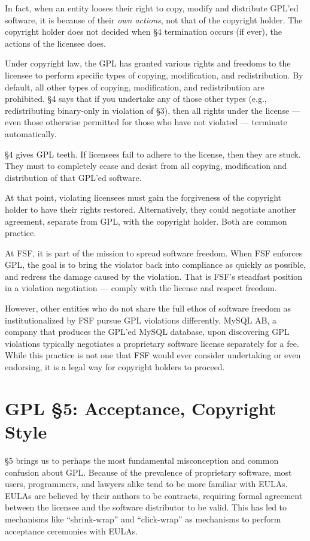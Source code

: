 \documentclass[12pt]{report}
\begin{document}
In fact, when an entity looses their right to copy, modify and distribute
GPL'ed software, it is because of their \emph{own actions}, not that of
the copyright holder.  The copyright holder does not decided when \S 4
termination occurs (if ever), the actions of the licensee does.

Under copyright law, the GPL has granted various rights and freedoms to
the licensee to perform specific types of copying, modification, and
redistribution.  By default, all other types of copying, modification, and
redistribution are prohibited.  \S 4 says that if you undertake any of
those other types (e.g., redistributing binary-only in violation of \S 3),
then all rights under the license --- even those otherwise permitted for
those who have not violated --- terminate automatically.

\S 4 gives GPL teeth.  If licensees fail to adhere to the license, then
they are stuck.  They must to completely cease and desist from all
copying, modification and distribution of that GPL'ed software.

At that point, violating licensees must gain the forgiveness of the
copyright holder to have their rights restored.  Alternatively, they could
negotiate another agreement, separate from GPL, with the copyright
holder.  Both are common practice.

At FSF, it is part of the mission to spread software freedom.  When FSF
enforces GPL, the goal is to bring the violator back into compliance as
quickly as possible, and redress the damage caused by the violation.
That is FSF's steadfast position in a violation negotiation --- comply
with the license and respect freedom.

However, other entities who do not share the full ethos of software
freedom as institutionalized by FSF pursue GPL violations differently.  MySQL
AB, a company that produces the GPL'ed MySQL database, upon discovering
GPL violations typically negotiates a proprietary software license
separately for a fee.  While this practice is not one that FSF would ever
consider undertaking or even endorsing, it is a legal way for copyright
holders to proceed.

\section{GPL \S 5: Acceptance, Copyright Style}
\label{GPLs5}

\S 5 brings us to perhaps the most fundamental misconception and common
confusion about GPL\@.  Because of the prevalence of proprietary software,
most users, programmers, and lawyers alike tend to be more familiar with
EULAs.  EULAs are believed by their authors to be contracts, requiring
formal agreement between the licensee and the software distributor to be
valid.  This has led to mechanisms like ``shrink-wrap'' and ``click-wrap''
as mechanisms to perform acceptance ceremonies with EULAs.
\end{document}
